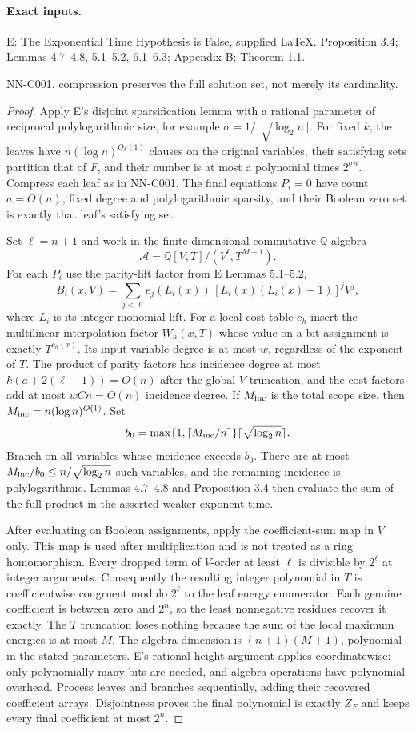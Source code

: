 \paragraph{Exact inputs.}
E: The Exponential Time Hypothesis is False, supplied LaTeX. Proposition 3.4; Lemmas 4.7--4.8, 5.1--5.2, 6.1--6.3; Appendix B; Theorem 1.1.

NN-C001. compression preserves the full solution set, not merely its cardinality.

\begin{proof}
Apply E's disjoint sparsification lemma with a rational parameter of reciprocal polylogarithmic size, for example $\sigma=1/\lceil\sqrt{\log_2n}\rceil$. For fixed $k$, the leaves have $n(\log n)^{O_k(1)}$ clauses on the original variables, their satisfying sets partition that of $F$, and their number is at most a polynomial times $2^{\sigma n}$. Compress each leaf as in NN-C001. The final equations $P_i=0$ have count $a=O(n)$, fixed degree and polylogarithmic sparsity, and their Boolean zero set is exactly that leaf's satisfying set.

Set $\ell=n+1$ and work in the finite-dimensional commutative $\mathbb Q$-algebra
\[
 \mathcal A=\mathbb Q[V,T]/(V^\ell,T^{M+1}).
\]
For each $P_i$ use the parity-lift factor from E Lemmas 5.1--5.2,
\[
 B_i(x,V)=\sum_{j<\ell}e_j(L_i(x))\,[L_i(x)(L_i(x)-1)]^jV^j,
\]
where $L_i$ is its integer monomial lift. For a local cost table $c_h$ insert the multilinear interpolation factor $W_h(x,T)$ whose value on a bit assignment is exactly $T^{c_h(x)}$. Its input-variable degree is at most $w$, regardless of the exponent of $T$. The product of parity factors has incidence degree at most $k(a+2(\ell-1))=O(n)$ after the global $V$ truncation, and the cost factors add at most $wCn=O(n)$ incidence degree. If $M_{\rm inc}$ is the total scope size, then $M_{\rm inc}=n(\log n)^{O(1)}$. Set
\[
 b_0=\max\{1,\lceil M_{\rm inc}/n\rceil\}\lceil\sqrt{\log_2n}\rceil.
\]
Branch on all variables whose incidence exceeds $b_0$. There are at most $M_{\rm inc}/b_0\leq n/\sqrt{\log_2 n}$ such variables, and the remaining incidence is polylogarithmic. Lemmas 4.7--4.8 and Proposition 3.4 then evaluate the sum of the full product in the asserted weaker-exponent time.

After evaluating on Boolean assignments, apply the coefficient-sum map in $V$ only. This map is used after multiplication and is not treated as a ring homomorphism. Every dropped term of $V$-order at least $\ell$ is divisible by $2^\ell$ at integer arguments. Consequently the resulting integer polynomial in $T$ is coefficientwise congruent modulo $2^\ell$ to the leaf energy enumerator. Each genuine coefficient is between zero and $2^n$, so the least nonnegative residues recover it exactly. The $T$ truncation loses nothing because the sum of the local maximum energies is at most $M$. The algebra dimension is $(n+1)(M+1)$, polynomial in the stated parameters. E's rational height argument applies coordinatewise: only polynomially many bits are needed, and algebra operations have polynomial overhead. Process leaves and branches sequentially, adding their recovered coefficient arrays. Disjointness proves the final polynomial is exactly $Z_F$ and keeps every final coefficient at most $2^n$.


\end{proof}
